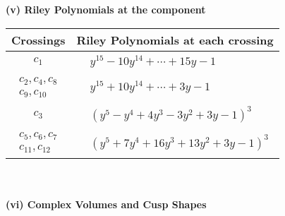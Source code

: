 \documentclass[1p]{elsarticle_modified}
\theoremstyle{definition}
\begin{document}
\newpage\renewcommand{\arraystretch}{1}
\flushleft \textbf{(v) Riley Polynomials at the component}\newline \\
\begin{tabular}{m{50pt}|m{274pt}}
Crossings & \hspace{64pt}Riley Polynomials at each crossing \\
\hline $$\begin{aligned}c_{1}\end{aligned}$$&$\begin{aligned}
&y^{15}-10 y^{14}+\cdots+15 y-1
\end{aligned}$\\
\hline $$\begin{aligned}c_{2},c_{4},c_{8}\\c_{9},c_{10}\end{aligned}$$&$\begin{aligned}
&y^{15}+10 y^{14}+\cdots+3 y-1
\end{aligned}$\\
\hline $$\begin{aligned}c_{3}\end{aligned}$$&$\begin{aligned}
&(y^5- y^4+4 y^3-3 y^2+3 y-1)^3
\end{aligned}$\\
\hline $$\begin{aligned}c_{5},c_{6},c_{7}\\c_{11},c_{12}\end{aligned}$$&$\begin{aligned}
&(y^5+7 y^4+16 y^3+13 y^2+3 y-1)^3
\end{aligned}$\\
\hline
\end{tabular}\\~\\
\newpage\flushleft \textbf{(vi) Complex Volumes and Cusp Shapes}
\end{document}
